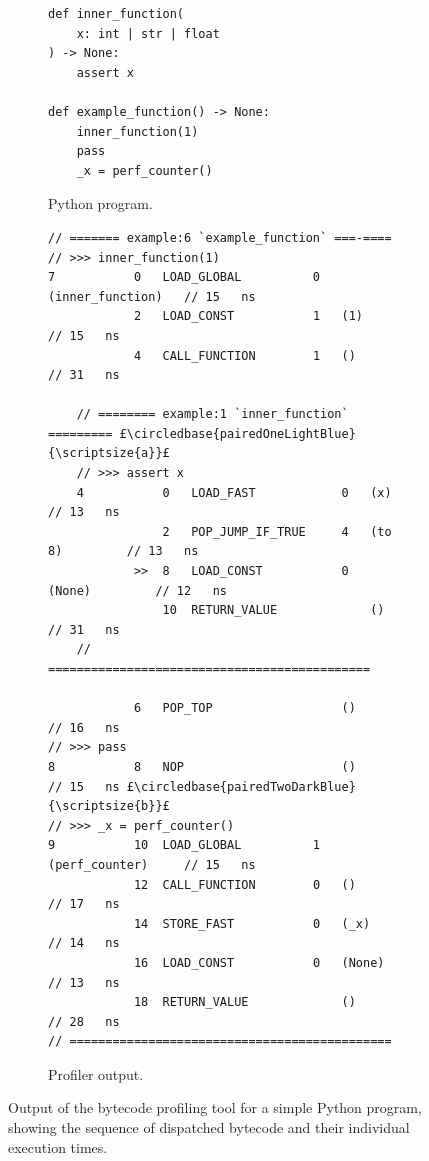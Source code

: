 \begin{figure}[H]
    \centering
    \begin{subfigure}[b]{0.3\textwidth}
       \centering
        \begin{verbatim}
def inner_function(
    x: int | str | float
) -> None:
    assert x

def example_function() -> None:
    inner_function(1)
    pass
    _x = perf_counter()
        \end{verbatim}
        \footnotesize\vspace{8em}
        \caption{Python program.}
        \label{listing:profiler-example-python}
    \end{subfigure}
    \hfill
    \begin{subfigure}[b]{0.65\textwidth}
        \centering
        \begin{verbatim}
// ======= example:6 `example_function` ===-====
// >>> inner_function(1)
7           0   LOAD_GLOBAL          0   (inner_function)   // 15   ns
            2   LOAD_CONST           1   (1)                // 15   ns
            4   CALL_FUNCTION        1   ()                 // 31   ns

    // ======== example:1 `inner_function` ========= £\circledbase{pairedOneLightBlue}{\scriptsize{a}}£
    // >>> assert x
    4           0   LOAD_FAST            0   (x)            // 13   ns
                2   POP_JUMP_IF_TRUE     4   (to 8)         // 13   ns
            >>  8   LOAD_CONST           0   (None)         // 12   ns
                10  RETURN_VALUE             ()             // 31   ns
    // =============================================

            6   POP_TOP                  ()                 // 16   ns
// >>> pass
8           8   NOP                      ()                 // 15   ns £\circledbase{pairedTwoDarkBlue}{\scriptsize{b}}£
// >>> _x = perf_counter()
9           10  LOAD_GLOBAL          1   (perf_counter)     // 15   ns
            12  CALL_FUNCTION        0   ()                 // 17   ns
            14  STORE_FAST           0   (_x)               // 14   ns
            16  LOAD_CONST           0   (None)             // 13   ns
            18  RETURN_VALUE             ()                 // 28   ns
// =============================================
        \end{verbatim}
        \caption{Profiler output.}
        \label{listing:profiler-example-bytecode}
    \end{subfigure}
    \vspace{1em}
    \captionsetup{name=Listing}
    \caption{Output of the bytecode profiling tool for a simple Python program, showing the sequence of dispatched bytecode and their individual execution times.}
    \label{listing:profiler-example}
\end{figure}


